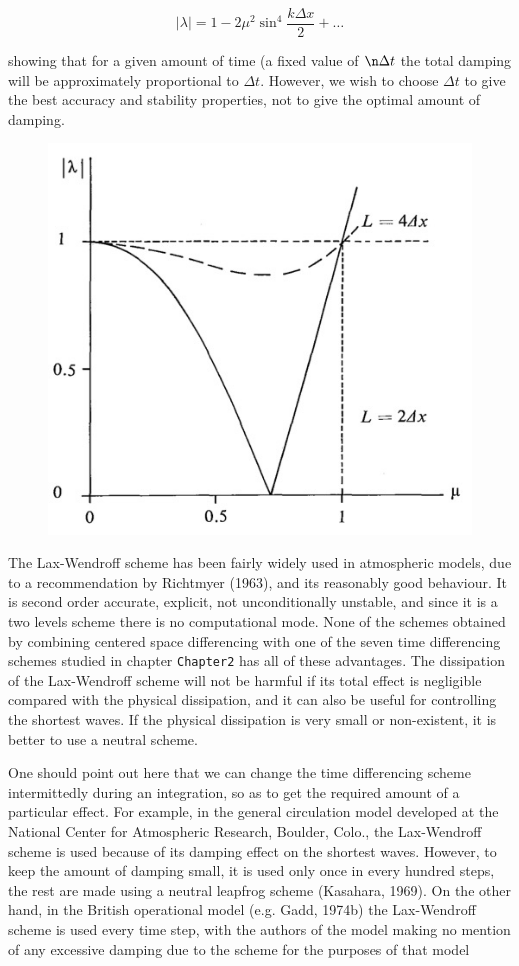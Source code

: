 \[|\lambda| = 1 - 2\mu^{2}\sin^{4}\frac{k\Delta x}{2} + \ldots\]

showing that for a given amount of time (a fixed value of
\(\n \Delta t\) the total damping will be approximately
proportional to \(\Delta t\). However, we wish to choose \(\Delta t\)
to give the best accuracy and stability properties, not to give the
optimal amount of damping.

\begin{figure}
 \centering
 \includegraphics[width = .7 \textwidth]{figs/NM/pic12.jpg}
 \caption{} \label{fig:}
\end{figure}

The Lax-Wendroff scheme has been fairly widely used in atmospheric
models, due to a recommendation by Richtmyer (1963), and its reasonably
good behaviour. It is second order accurate, explicit, not
unconditionally unstable, and since it is a two levels scheme there is
no computational mode. None of the schemes obtained by combining
centered space differencing with one of the seven time differencing
schemes studied in chapter \texttt{Chapter2} has all of these
advantages. The dissipation of the Lax-Wendroff scheme will not be
harmful if its total effect is negligible compared with the physical
dissipation, and it can also be useful for controlling the shortest
waves. If the physical dissipation is very small or non-existent, it is
better to use a neutral scheme.

One should point out here that we can change the time differencing
scheme intermittedly during an integration, so as to get the required
amount of a particular effect. For example, in the general circulation
model developed at the National Center for Atmospheric Research,
Boulder, Colo., the Lax-Wendroff scheme is used because of its damping
effect on the shortest waves. However, to keep the amount of damping
small, it is used only once in every hundred steps, the rest are made
using a neutral leapfrog scheme (Kasahara, 1969). On the other hand, in
the British operational model (e.g. Gadd, 1974b) the Lax-Wendroff scheme
is used every time step, with the authors of the model making no mention
of any excessive damping due to the scheme for the purposes of that
model


